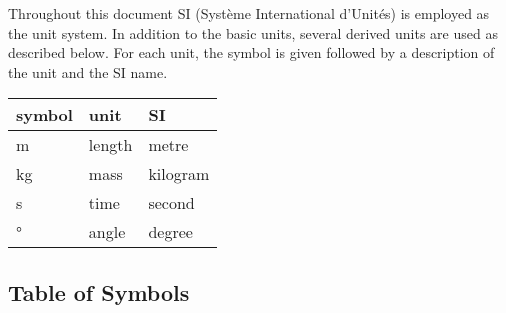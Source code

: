 \documentclass[12pt, titlepage]{article}
\begin{document}
Throughout this document SI (Syst\`{e}me International d'Unit\'{e}s) is
employed as the unit system. In addition to the basic units, several derived
units are
used as described below.  For each unit, the symbol is given followed by a
description of the unit and the SI name.\\

\renewcommand{\arraystretch}{1.2}
\begin{center}
  \noindent \begin{tabular}{l l l} 
    \toprule		
    \textbf{symbol} & \textbf{unit} & \textbf{SI}\\
    \midrule 
    \si{\metre} & length & metre\\
    \si{\kilogram} & mass & kilogram\\
    \si{\second} & time & second\\
    \si{\degree} & angle & degree\\
    \bottomrule
  \end{tabular}
\end{center}

\newpage

\subsection{Table of Symbols}
\end{document}
